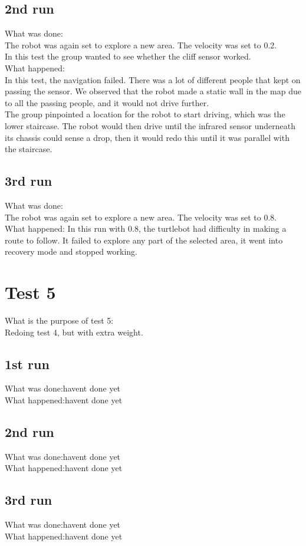 \subsection{2nd run}
What was done:\\
The robot was again set to explore a new area. The velocity was set to 0.2.\\
In this test the group wanted to see whether the cliff sensor worked.\\
What happened:\\
In this test, the navigation failed. There was a lot of different people that kept on passing the sensor. We observed that the robot made a static wall in the map due to all the passing people, and it would not drive further.\\
The group pinpointed a location for the robot to start driving, which was the lower staircase. The robot would then drive until the infrared sensor underneath its chassis could sense a drop, then it would redo this until it was parallel with the staircase.

\subsection{3rd run}
What was done:\\
The robot was again set to explore a new area. The velocity was set to 0.8.\\
What happened:
In this run with 0.8, the turtlebot had difficulty in making a route to follow. It failed to explore any part of the selected area, it went into recovery mode and stopped working.

%
%

\section{Test 5}
What is the purpose of test 5: \\
Redoing test 4, but with extra weight.

\subsection{1st run}
What was done:havent done yet
\\
What happened:havent done yet

\subsection{2nd run}
What was done:havent done yet
\\
What happened:havent done yet

\subsection{3rd run}
What was done:havent done yet
\\
What happened:havent done yet




